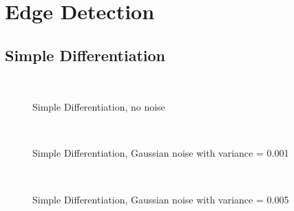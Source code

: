 \documentclass[10pt,a4paper]{article}
\begin{document}
\section{Edge Detection}
\subsection{Simple Differentiation}
\begin{figure}
  \centering
     \\
  \caption{Simple Differentiation, no noise}
  \label{fig:sd_no_noise}
\end{figure}

\begin{figure}
  \centering
     \\
  \caption{Simple Differentiation, Gaussian noise with variance = 0.001}
  \label{fig:sd_001}
\end{figure}

\begin{figure}
  \centering
     \\
  \caption{Simple Differentiation, Gaussian noise with variance = 0.005}
  \label{fig:sd_005}
\end{figure}
\end{document}
